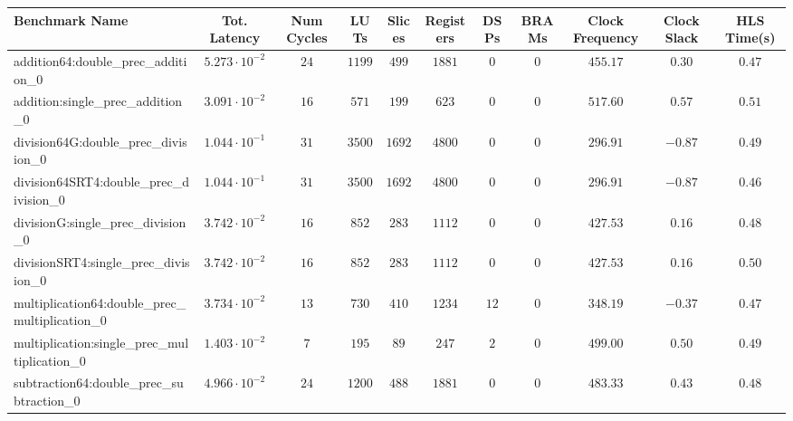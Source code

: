 \begin{tabular}{|l|c|c|c|c|c|c|c|c|c|c|}
\hline
Benchmark Name                                   & Tot. Latency            & Num Cycles & LUTs      & Slices   & Registers & DSPs   & BRAMs & Clock Frequency & Clock Slack & HLS Time(s) \\
\hline
addition64:double\_prec\_addition\_0             & $ 5.273 \cdot 10^{-2} $ & $ 24     $ & $ 1199  $ & $ 499  $ & $ 1881  $ & $ 0  $ & $ 0 $ & $ 455.17      $ & $ 0.30    $ & $ 0.47    $ \\
addition:single\_prec\_addition\_0               & $ 3.091 \cdot 10^{-2} $ & $ 16     $ & $ 571   $ & $ 199  $ & $ 623   $ & $ 0  $ & $ 0 $ & $ 517.60      $ & $ 0.57    $ & $ 0.51    $ \\
division64G:double\_prec\_division\_0            & $ 1.044 \cdot 10^{-1} $ & $ 31     $ & $ 3500  $ & $ 1692 $ & $ 4800  $ & $ 0  $ & $ 0 $ & $ 296.91      $ & $ -0.87   $ & $ 0.49    $ \\
division64SRT4:double\_prec\_division\_0         & $ 1.044 \cdot 10^{-1} $ & $ 31     $ & $ 3500  $ & $ 1692 $ & $ 4800  $ & $ 0  $ & $ 0 $ & $ 296.91      $ & $ -0.87   $ & $ 0.46    $ \\
divisionG:single\_prec\_division\_0              & $ 3.742 \cdot 10^{-2} $ & $ 16     $ & $ 852   $ & $ 283  $ & $ 1112  $ & $ 0  $ & $ 0 $ & $ 427.53      $ & $ 0.16    $ & $ 0.48    $ \\
divisionSRT4:single\_prec\_division\_0           & $ 3.742 \cdot 10^{-2} $ & $ 16     $ & $ 852   $ & $ 283  $ & $ 1112  $ & $ 0  $ & $ 0 $ & $ 427.53      $ & $ 0.16    $ & $ 0.50    $ \\
multiplication64:double\_prec\_multiplication\_0 & $ 3.734 \cdot 10^{-2} $ & $ 13     $ & $ 730   $ & $ 410  $ & $ 1234  $ & $ 12 $ & $ 0 $ & $ 348.19      $ & $ -0.37   $ & $ 0.47    $ \\
multiplication:single\_prec\_multiplication\_0   & $ 1.403 \cdot 10^{-2} $ & $ 7      $ & $ 195   $ & $ 89   $ & $ 247   $ & $ 2  $ & $ 0 $ & $ 499.00      $ & $ 0.50    $ & $ 0.49    $ \\
subtraction64:double\_prec\_subtraction\_0       & $ 4.966 \cdot 10^{-2} $ & $ 24     $ & $ 1200  $ & $ 488  $ & $ 1881  $ & $ 0  $ & $ 0 $ & $ 483.33      $ & $ 0.43    $ & $ 0.48    $ \\

\end{tabular}

